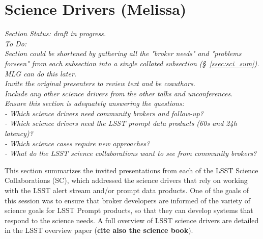 
\section{Science Drivers (Melissa)} \label{sec:science}


\noindent
{\it Section Status: draft in progress. \\
To Do: \\
Section could be shortened by gathering all the "broker needs" and "problems forseen" from each subsection into a single collated subsection (\S~\ref{ssec:sci_sum}). MLG can do this later. \\ 
Invite the original presenters to review text and be coauthors.\\
Include any other science drivers from the other talks and unconferences.\\ Ensure this section is adequately answering the questions: \\
 - Which science drivers need community brokers and follow-up? \\
 - Which science drivers need the LSST prompt data products (60s and 24h latency)?  \\
 - Which science cases require new approaches? \\
 - What do the LSST science collaborations want to see from community brokers? \\

}

\medskip
This section summarizes the invited presentations from each of the LSST Science Collaborations (SC), which addressed the science drivers that rely on working with the LSST alert stream and/or prompt data products. One of the goals of this session was to ensure that broker developers are informed of the variety of science goals for LSST Prompt products, so that they can develop systems that respond to the science needs. A full overview of LSST science drivers are detailed in the LSST overview paper \cite{2019ApJ...873..111I} ({\bf cite also the science book}).



